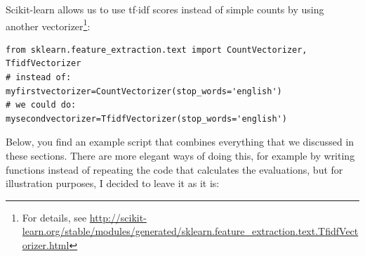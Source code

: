 \documentclass[a4paper,12pt]{book}
\begin{document}
Scikit-learn allows us to use tf$\cdot$idf scores instead of simple counts by using another vectorizer\footnote{For details, see \url{http://scikit-learn.org/stable/modules/generated/sklearn.feature_extraction.text.TfidfVectorizer.html}}:

\begin{lstlisting}
from sklearn.feature_extraction.text import CountVectorizer, TfidfVectorizer
# instead of:
myfirstvectorizer=CountVectorizer(stop_words='english')
# we could do:
mysecondvectorizer=TfidfVectorizer(stop_words='english')
\end{lstlisting}

Below, you find an example script that combines everything that we discussed in these sections. There are more elegant ways of doing this, for example by writing functions instead of repeating the code that calculates the evaluations, but for illustration purposes, I decided to leave it as it is:
\end{document}
